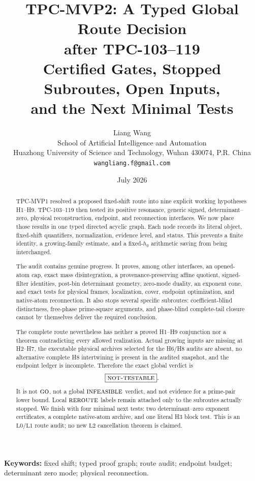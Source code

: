 \documentclass[11pt,a4paper]{article}
\title{\bfseries TPC-MVP2: A Typed Global Route Decision\\
after TPC-103--119\\[0.3em]
\large Certified Gates, Stopped Subroutes, Open Inputs,\\
and the Next Minimal Tests}
\author{Liang Wang\\
School of Artificial Intelligence and Automation\\
Huazhong University of Science and Technology, Wuhan 430074, P.R. China\\
\texttt{wangliang.f@gmail.com}}
\date{July 2026}
\theoremstyle{definition}
\theoremstyle{remark}
\newcommand{\Lzero}{\mathrm{L0}}
\newcommand{\Lone}{\mathrm{L1}}
\newcommand{\Ltwo}{\mathrm{L2}}
\newcommand{\GO}{\textnormal{\textsc{go}}}
\newcommand{\RE}{\textnormal{\textsc{reroute}}}
\newcommand{\INF}{\textnormal{\textsc{infeasible}}}
\begin{document}
\maketitle

\begin{abstract}
TPC-MVP1 resolved a proposed fixed-shift route into nine explicit
working hypotheses H1--H9.  TPC-103--119 then tested its positive
resonance, generic signed, determinant--zero, physical reconstruction,
endpoint, and reconnection interfaces.  We now place those results in
one typed directed acyclic graph.  Each node records its literal
object, fixed-shift quantifiers, normalization, evidence level, and
status.  This prevents a finite identity, a growing-family estimate,
and a fixed-\(h_0\) arithmetic saving from being interchanged.

The audit contains genuine progress.  It proves, among other
interfaces, an opened-atom cap, exact mass disintegration, a
provenance-preserving affine quotient, signed-filter identities,
post-bin determinant geometry, zero-mode duality, an exponent cone,
and exact tests for physical frames, localization, cover, endpoint
optimization, and native-atom reconnection.  It also stops several
specific subroutes: coefficient-blind distinctness, free-phase
prime-square arguments, and phase-blind complete-tail closure cannot
by themselves deliver the required conclusion.

The complete route nevertheless has neither a proved H1--H9
conjunction nor a theorem contradicting every allowed realization.
Actual growing inputs are missing at H2--H7, the executable physical
archives selected for the H6/H8 audits are absent, no alternative
complete H8 intertwining is present in the audited snapshot, and the
endpoint ledger is incomplete.  Therefore the exact global verdict is
\[
 \boxed{\text{\normalfont\textsc{not-testable}}}.
\]
It is not \(\GO\), not a global \(\INF\) verdict, and not evidence for
a prime-pair lower bound.  Local \(\RE\) labels remain attached only
to the subroutes actually stopped.  We finish with four minimal next
tests: two determinant--zero exponent certificates, a complete
native-atom archive, and one literal H3 block test.  This is an
\(\Lzero/\Lone\) route audit; no new \(\Ltwo\) cancellation theorem is
claimed.
\end{abstract}

\medskip
\noindent\textbf{Keywords:} fixed shift; typed proof graph; route
audit; endpoint budget; determinant zero mode; physical
reconnection.
\end{document}
